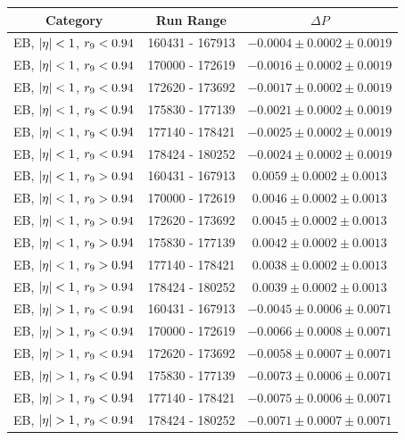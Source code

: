 \begin{table}[hbt]
\centering
\begin{tabular}{|c|c|c|}
\hline
Category & Run Range & $\Delta P$ \\
\hline
EB, $ |\eta| < 1 $, $r_{9} < 0.94$ & 160431 - 167913 & $ -0.0004 \pm 0.0002 \pm 0.0019$ \\
EB, $ |\eta| < 1 $, $r_{9} < 0.94$ & 170000 - 172619 & $ -0.0016 \pm 0.0002 \pm 0.0019$ \\
EB, $ |\eta| < 1 $, $r_{9} < 0.94$ & 172620 - 173692 & $ -0.0017 \pm 0.0002 \pm 0.0019$ \\
EB, $ |\eta| < 1 $, $r_{9} < 0.94$ & 175830 - 177139 & $ -0.0021 \pm 0.0002 \pm 0.0019$ \\
EB, $ |\eta| < 1 $, $r_{9} < 0.94$ & 177140 - 178421 & $ -0.0025 \pm 0.0002 \pm 0.0019$ \\
EB, $ |\eta| < 1 $, $r_{9} < 0.94$ & 178424 - 180252 & $ -0.0024 \pm 0.0002 \pm 0.0019$ \\
\hline							  		  
EB, $ |\eta| < 1 $, $r_{9} > 0.94$ & 160431 - 167913 & $ 0.0059 \pm 0.0002 \pm 0.0013$ \\
EB, $ |\eta| < 1 $, $r_{9} > 0.94$ & 170000 - 172619 & $ 0.0046 \pm 0.0002 \pm 0.0013$ \\
EB, $ |\eta| < 1 $, $r_{9} > 0.94$ & 172620 - 173692 & $ 0.0045 \pm 0.0002 \pm 0.0013$ \\
EB, $ |\eta| < 1 $, $r_{9} > 0.94$ & 175830 - 177139 & $ 0.0042 \pm 0.0002 \pm 0.0013$ \\
EB, $ |\eta| < 1 $, $r_{9} > 0.94$ & 177140 - 178421 & $ 0.0038 \pm 0.0002 \pm 0.0013$ \\
EB, $ |\eta| < 1 $, $r_{9} > 0.94$ & 178424 - 180252 & $ 0.0039 \pm 0.0002 \pm 0.0013$ \\
\hline							  		  
EB, $ |\eta| > 1 $, $r_{9} < 0.94$ & 160431 - 167913 & $ -0.0045 \pm 0.0006 \pm 0.0071$ \\
EB, $ |\eta| > 1 $, $r_{9} < 0.94$ & 170000 - 172619 & $ -0.0066 \pm 0.0008 \pm 0.0071$ \\
EB, $ |\eta| > 1 $, $r_{9} < 0.94$ & 172620 - 173692 & $ -0.0058 \pm 0.0007 \pm 0.0071$ \\
EB, $ |\eta| > 1 $, $r_{9} < 0.94$ & 175830 - 177139 & $ -0.0073 \pm 0.0006 \pm 0.0071$ \\
EB, $ |\eta| > 1 $, $r_{9} < 0.94$ & 177140 - 178421 & $ -0.0075 \pm 0.0006 \pm 0.0071$ \\
EB, $ |\eta| > 1 $, $r_{9} < 0.94$ & 178424 - 180252 & $ -0.0071 \pm 0.0007 \pm 0.0071$ \\

\end{tabular}
\end{table}
